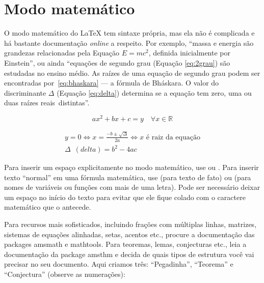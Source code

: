 \enlargethispage{\baselineskip}

\section{Modo matemático}

O modo matemático do \LaTeX{} tem sintaxe própria, mas ela não é complicada e
há bastante documentação \emph{online} a respeito. Por exemplo, ``massa e
energia são grandezas relacionadas pela Equação $E=mc^2$, definida inicialmente
por Einstein'', ou ainda ``equações de segundo grau (Equação \ref{eq:2grau})
são estudadas no ensino médio. As raízes de uma equação de segundo grau podem
ser encontradas por~\eqref{eq:bhaskara} --- a fórmula de Bháskara.
O valor do discriminante $\Delta$ (Equação \ref{eq:delta}) determina se a
equação tem zero, uma ou duas raízes reais~distintas''.

\begin{equation}
  \label{eq:2grau}
  ax^2+bx+c=y \quad \forall x \in \mathbb{R}
\end{equation}

\begin{gather}
  \label{eq:bhaskara}
    y=0 \Leftrightarrow x=\frac{-b \pm \sqrt{\Delta}}{2a}
    \Leftrightarrow x \text{ é raiz da equação}\\
  \label{eq:delta}
    \Delta\enspace(\mathit{delta}) = b^2-4ac
\end{gather}

\enlargethispage{\baselineskip}

Para inserir um espaço explicitamente no modo matemático, use
 ou . Para inserir texto ``normal'' em
uma fórmula matemática, use  (para texto de fato)
ou  (para nomes de variáveis ou funções com
mais de uma letra). Pode ser necessário deixar um espaço no início do
texto para evitar que ele fique colado com o caractere matemático que
o antecede.

Para recursos mais sofisticados, incluindo frações com múltiplas linhas,
matrizes, sistemas de equações alinhadas, setas, acentos etc., procure
a documentação das packages \textsf{amsmath} e \textsf{mathtools}. Para
teoremas, lemas, conjecturas etc., leia a documentação da package
\textsf{amsthm} e decida de quais tipos de estrutura você vai precisar
no seu documento. Aqui criamos três: ``Pegadinha'', ``Teorema'' e
``Conjectura'' (observe as numerações):

